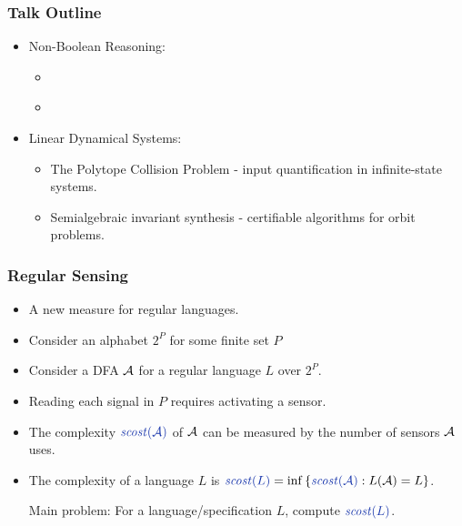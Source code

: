 
\begin{frame}
\frametitle{Talk Outline}
\begin{itemize}
\item Non-Boolean Reasoning:
\begin{itemize} 
    \item {}
	\item[\itemnow] \textbf{}
\end{itemize}
\item Linear Dynamical Systems:
\begin{itemize}
\item[\itemlater] The Polytope Collision Problem - input quantification in infinite-state systems.
\item[\itemlater] Semialgebraic invariant synthesis - certifiable algorithms for orbit problems.
\end{itemize}
\end{itemize}
\end{frame}

\begin{frame}
	\frametitle{Regular Sensing}
	\begin{itemize}[<+->]
		\item A new  measure for regular languages.
		\item Consider an alphabet $2^P$ for some finite set $P$
		\item Consider a DFA ${\cal A}$ for a regular language $L$ over $2^P$.
		\item Reading each signal in $P$ requires activating a sensor.
		\item The complexity $\emc{sensec}{\scost(\A)}$ of ${\cal A}$ can be measured by the  number of sensors ${\cal A}$ uses.
		\item The complexity of a language $L$ is $\emc{sensec}{\scost(L)}=\inf\set{\emc{sensec}{\scost(\A)}: L(\A)=L}$.
		
		\begin{beamerboxesrounded}[upper=uppercollem,lower=lowercollem,shadow=true]{Main problem:}
					For a language/specification $L$, compute $\emc{sensec}{\scost(L)}$.
				\end{beamerboxesrounded}
	\end{itemize}
\end{frame}

